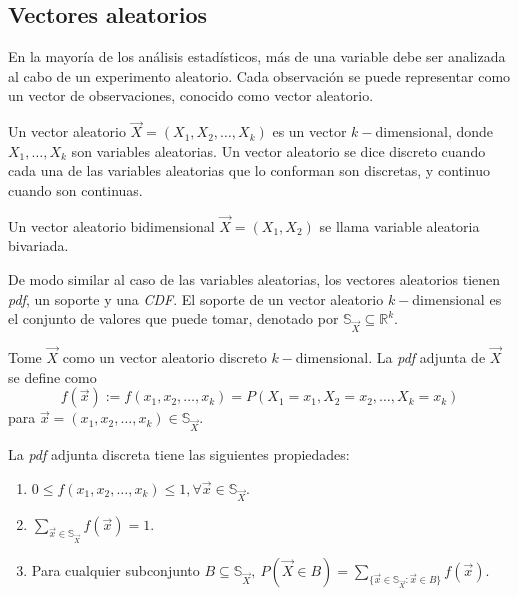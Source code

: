 	\subsection{Vectores aleatorios}
	En la mayoría de los análisis estadísticos, más de una variable debe ser analizada al cabo de un experimento aleatorio. Cada observación se puede representar como un vector de observaciones, conocido como vector aleatorio.
	
	\begin{defi}
		Un vector aleatorio $\vec{X}=(X_1,X_2,\dots,X_k)$ es un vector $k-$dimensional, donde $X_1,\dots,X_k$ son variables aleatorias. Un vector aleatorio se dice discreto cuando cada una de las variables aleatorias que lo conforman son discretas, y continuo cuando son continuas.
	\end{defi}
	
	\begin{defi}
		Un vector aleatorio bidimensional $\vec{X}=(X_1,X_2)$ se llama variable aleatoria bivariada.
	\end{defi}
	
	De modo similar al caso de las variables aleatorias, los vectores aleatorios tienen \textit{pdf}, un soporte y una \textit{CDF}. El soporte de un vector aleatorio $k-$dimensional es el conjunto de valores que puede tomar, denotado por $\mathbb{S}_{\vec{X}}\subseteq\mathbb{R}^k.$
	
	\begin{defi}
		Tome $\vec{X}$ como un vector aleatorio discreto $k-$dimensional. La \textit{pdf} adjunta de $\vec{X}$ se define como
		$$f(\vec{x}):=f(x_1,x_2,\dots,x_k)=P(X_1=x_1,X_2=x_2,\dots, X_k=x_k)$$
		para $\vec{x}=(x_1,x_2,\dots,x_k)\in\mathbb{S}_{\vec{X}}.$
	\end{defi}
	La \textit{pdf} adjunta discreta tiene las siguientes propiedades:
	\begin{enumerate}
		\item $0\leq f(x_1,x_2,\dots,x_k)\leq1, \forall \vec{x}\in\mathbb{S}_{\vec{X}}.$
		\item $\sum_{\vec{x}\in\mathbb{S}_{\vec{X}}}f(\vec{x})=1.$
		\item Para cualquier subconjunto $B\subseteq \mathbb{S}_{\vec{X}},\ P(\vec{X}\in B)=\sum_{\{\vec{x}\in\mathbb{S}_{\vec{X}}:\vec{x}\in B\}}f(\vec{x}).$
	\end{enumerate}
	

